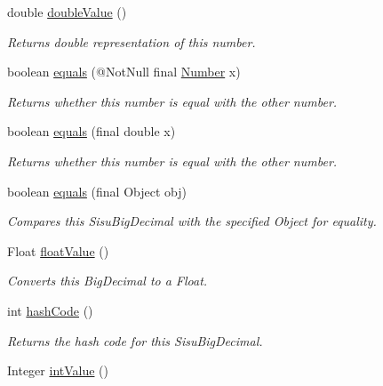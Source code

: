\begin{DoxyCompactItemize}
double \hyperlink{interfacecom_1_1aarrelaakso_1_1drawl_1_1_number_ad409a636270d5fcc2591791a4e862179}{double\+Value} ()
\begin{DoxyCompactList}\small\item\em Returns double representation of this number. \end{DoxyCompactList}\item 
boolean \hyperlink{interfacecom_1_1aarrelaakso_1_1drawl_1_1_number_afe7ed1040e76bfb7a01c1e3835218827}{equals} (@Not\+Null final \hyperlink{interfacecom_1_1aarrelaakso_1_1drawl_1_1_number}{Number} x)
\begin{DoxyCompactList}\small\item\em Returns whether this number is equal with the other number. \end{DoxyCompactList}\item 
boolean \hyperlink{interfacecom_1_1aarrelaakso_1_1drawl_1_1_number_a102dab4f981a76317b20d69d352ddb15}{equals} (final double x)
\begin{DoxyCompactList}\small\item\em Returns whether this number is equal with the other number. \end{DoxyCompactList}\item 
boolean \hyperlink{interfacecom_1_1aarrelaakso_1_1drawl_1_1_number_a9cf883b0a5979a9f0420cca2c2ff9d89}{equals} (final Object obj)
\begin{DoxyCompactList}\small\item\em Compares this Sisu\+Big\+Decimal with the specified Object for equality. \end{DoxyCompactList}\item 
Float \hyperlink{interfacecom_1_1aarrelaakso_1_1drawl_1_1_number_ad6df5caf5478cc3f85cc808cf39a0610}{float\+Value} ()
\begin{DoxyCompactList}\small\item\em Converts this Big\+Decimal to a Float. \end{DoxyCompactList}\item 
int \hyperlink{interfacecom_1_1aarrelaakso_1_1drawl_1_1_number_a493e402b6856cded24d43022bd1b816a}{hash\+Code} ()
\begin{DoxyCompactList}\small\item\em Returns the hash code for this Sisu\+Big\+Decimal. \end{DoxyCompactList}\item 
Integer \hyperlink{interfacecom_1_1aarrelaakso_1_1drawl_1_1_number_a82bd01108e6f99cba2e83759fa363f39}{int\+Value} ()

\end{DoxyCompactItemize}
